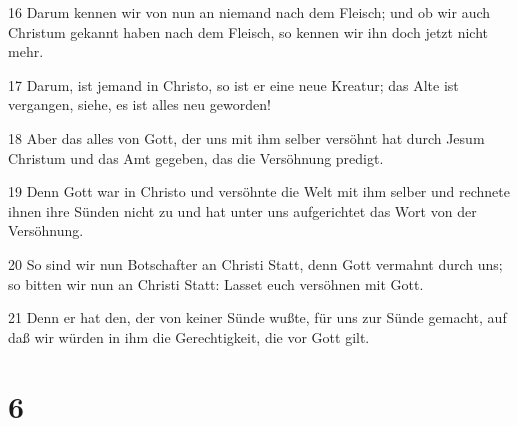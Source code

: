 \par 16 Darum kennen wir von nun an niemand nach dem Fleisch; und ob wir auch Christum gekannt haben nach dem Fleisch, so kennen wir ihn doch jetzt nicht mehr.
\par 17 Darum, ist jemand in Christo, so ist er eine neue Kreatur; das Alte ist vergangen, siehe, es ist alles neu geworden!
\par 18 Aber das alles von Gott, der uns mit ihm selber versöhnt hat durch Jesum Christum und das Amt gegeben, das die Versöhnung predigt.
\par 19 Denn Gott war in Christo und versöhnte die Welt mit ihm selber und rechnete ihnen ihre Sünden nicht zu und hat unter uns aufgerichtet das Wort von der Versöhnung.
\par 20 So sind wir nun Botschafter an Christi Statt, denn Gott vermahnt durch uns; so bitten wir nun an Christi Statt: Lasset euch versöhnen mit Gott.
\par 21 Denn er hat den, der von keiner Sünde wußte, für uns zur Sünde gemacht, auf daß wir würden in ihm die Gerechtigkeit, die vor Gott gilt.

\chapter{6}

